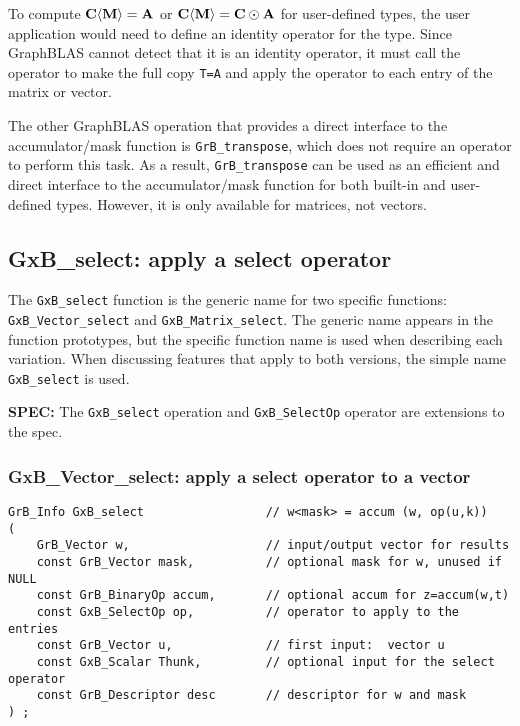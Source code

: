 \documentclass[12pt]{article}
\begin{document}
To compute ${\bf C \langle M \rangle = A}$ or ${\bf C \langle M \rangle = C
\odot A}$ for user-defined types, the user application would need to define an
identity operator for the type.  Since GraphBLAS cannot detect that it is an
identity operator, it must call the operator to make the full copy \verb'T=A'
and apply the operator to each entry of the matrix or vector.

The other GraphBLAS operation that provides a direct interface to the
accumulator/mask function is \verb'GrB_transpose', which does not require an
operator to perform this task.  As a result, \verb'GrB_transpose' can be used
as an efficient and direct interface to the accumulator/mask function for
both built-in and user-defined types.  However, it is only available for
matrices, not vectors.

\newpage
\subsection{{\sf GxB\_select:} apply a select operator} %
\label{select}

The \verb'GxB_select' function is the generic name for two specific functions:
\\ \verb'GxB_Vector_select' and  \verb'GxB_Matrix_select'.  The generic name
appears in the function prototypes, but the specific function name is used when
describing each variation.  When discussing features that apply to both
versions, the simple name \verb'GxB_select' is used.

\begin{spec}
{\bf SPEC:} The \verb'GxB_select' operation and \verb'GxB_SelectOp' operator
are extensions to the spec.
\end{spec}

\subsubsection{{\sf GxB\_Vector\_select:} apply a select operator to a vector}
\label{select_vector}

\begin{mdframed}[userdefinedwidth=6in]
{\footnotesize
\begin{verbatim}
GrB_Info GxB_select                 // w<mask> = accum (w, op(u,k))
(
    GrB_Vector w,                   // input/output vector for results
    const GrB_Vector mask,          // optional mask for w, unused if NULL
    const GrB_BinaryOp accum,       // optional accum for z=accum(w,t)
    const GxB_SelectOp op,          // operator to apply to the entries
    const GrB_Vector u,             // first input:  vector u
    const GxB_Scalar Thunk,         // optional input for the select operator
    const GrB_Descriptor desc       // descriptor for w and mask
) ;
\end{verbatim} } \end{mdframed}
\end{document}
